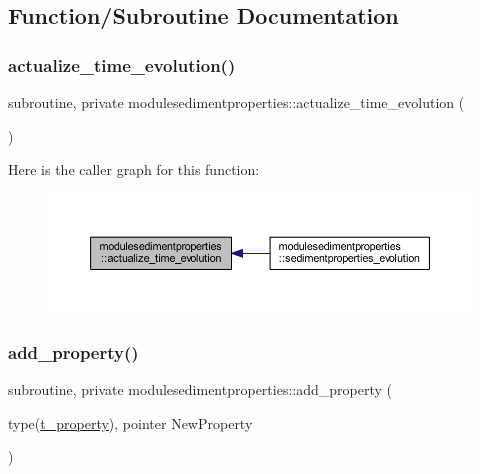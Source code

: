 \subsection{Function/\+Subroutine Documentation}
\mbox{\label{namespacemodulesedimentproperties_a6cedd3db0fa694031e6d17f2ef9d7eb9}} 
\subsubsection{\texorpdfstring{actualize\+\_\+time\+\_\+evolution()}{actualize\_time\_evolution()}}
{\footnotesize\ttfamily subroutine, private modulesedimentproperties\+::actualize\+\_\+time\+\_\+evolution (\begin{DoxyParamCaption}{ }\end{DoxyParamCaption})\hspace{0.3cm}{\ttfamily [private]}}

Here is the caller graph for this function\+:\nopagebreak
\begin{figure}[H]
\begin{center}
\leavevmode
\includegraphics[width=350pt]{namespacemodulesedimentproperties_a6cedd3db0fa694031e6d17f2ef9d7eb9_icgraph}
\end{center}
\end{figure}
\mbox{\label{namespacemodulesedimentproperties_a6c62c3f418883d0d880c6158695566b6}} 
\subsubsection{\texorpdfstring{add\+\_\+property()}{add\_property()}}
{\footnotesize\ttfamily subroutine, private modulesedimentproperties\+::add\+\_\+property (\begin{DoxyParamCaption}\item[{type(\mbox{\hyperlink{structmodulesedimentproperties_1_1t__property}{t\+\_\+property}}), pointer}]{New\+Property }\end{DoxyParamCaption})\hspace{0.3cm}{\ttfamily [private]}}

